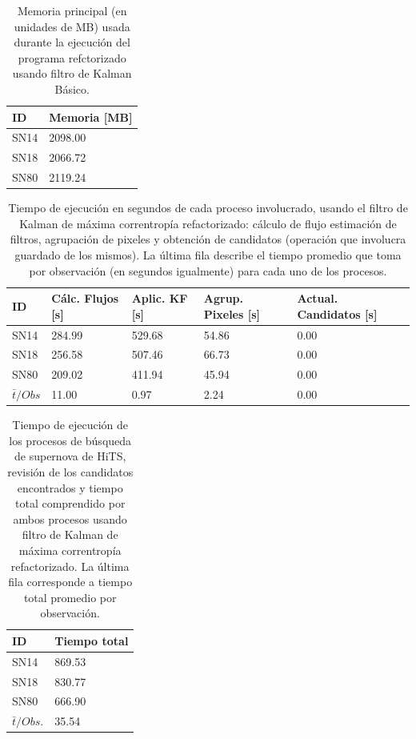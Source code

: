 \begin{table}[h!]
\centering
\caption{Memoria principal (en unidades de MB) usada durante la ejecuci\'on del programa refctorizado usando filtro de Kalman B\'asico.}
\begin{tabular}{|l|l|}
\hline
\textbf{ID} & Memoria [MB]\\\hline\hline
SN14 & 2098.00\\\hline
SN18 & 2066.72\\\hline
SN80 & 2119.24\\\hline
\end{tabular}
\label{tab:mem3}
\end{table}

\begin{table}[h!]
\centering
\caption{Tiempo de ejecuci\'on en segundos de cada proceso involucrado, usando el filtro de Kalman de m\'axima correntrop\'ia refactorizado: c\'alculo de flujo estimaci\'on de filtros, agrupaci\'on de pixeles y obtenci\'on de candidatos (operaci\'on que involucra guardado de los mismos). La \'ultima fila describe el tiempo promedio que toma por observaci\'on (en segundos igualmente) para cada uno de los procesos. }
\begin{tabular}{|l|l|l|l|l|}
\hline
\textbf{ID} & \textbf{C\'alc. Flujos [s]} & \textbf{Aplic. KF [s]} &  \textbf{Agrup. Pixeles [s]}  & \textbf{Actual. Candidatos [s]}\\ \hline \hline
SN14        & 284.99            & 529.68        &  54.86 & 0.00 \\ \hline
SN18            & 256.58             & 507.46         &  66.73  & 0.00\\ \hline
SN80            & 209.02             & 411.94         &   45.94 & 0.00 \\ \hline \hline
$\bar{t}/Obs$ & 11.00 &  0.97 & 2.24 & 0.00\\\hline 
\end{tabular}
\label{tab:t9}
\end{table}

\begin{table}[h!]
\centering
\caption{Tiempo de ejecuci\'on de los procesos de b\'usqueda de supernova de HiTS, revisi\'on de los candidatos encontrados y tiempo total comprendido por ambos procesos usando filtro de Kalman de m\'axima correntrop\'ia refactorizado. La \'ultima fila corresponde a tiempo total promedio por observaci\'on.}
\begin{tabular}{|l|l|}
\hline
\textbf{ID} & \textbf{Tiempo total} \\ \hline
\hline
SN14  & 869.53 \\\hline
SN18  & 830.77\\\hline
SN80  & 666.90 \\\hline\hline
 $\bar{t}/Obs. $& 35.54 \\\hline 
\end{tabular}

\label{tab:t10}
\end{table}

